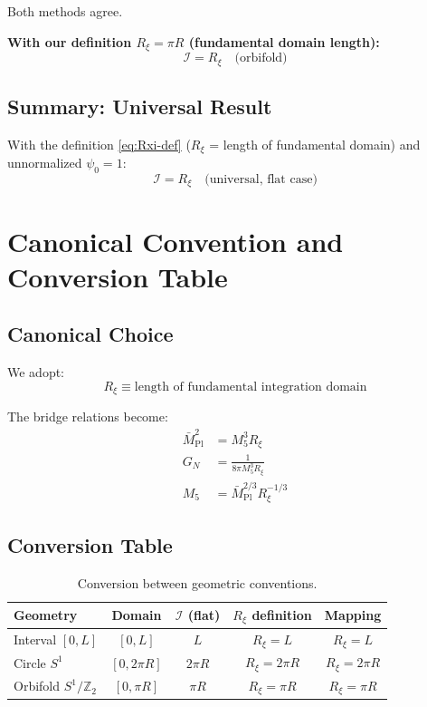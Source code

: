 \documentclass[11pt,a4paper]{article}
\newcommand{\Rxi}{R_\xi}
\newcommand{\Mplbar}{\bar{M}_{\mathrm{Pl}}}
\newcommand{\Mfive}{M_5}
\newcommand{\calI}{\mathcal{I}}
\newcommand{\GN}{G_N}
\begin{document}
Both methods agree.

\textbf{With our definition $\Rxi = \pi R$ (fundamental domain length):}
\begin{equation}
\calI = \Rxi \quad \text{(orbifold)}
\label{eq:I-Rxi-orbifold}
\end{equation}

\subsection{Summary: Universal Result}

With the definition \eqref{eq:Rxi-def} ($\Rxi$ = length of fundamental domain)
and unnormalized $\psi_0 = 1$:
\begin{equation}
\boxed{\calI = \Rxi \quad \text{(universal, flat case)}}
\label{eq:I-Rxi-universal}
\end{equation}

\section{Canonical Convention and Conversion Table}

\subsection{Canonical Choice}

We adopt:
\begin{equation}
\Rxi \equiv \text{length of fundamental integration domain}
\label{eq:canonical}
\end{equation}

The bridge relations become:
\begin{align}
\Mplbar^2 &= \Mfive^3 \Rxi \label{eq:bridge-canon} \\
\GN &= \frac{1}{8\pi \Mfive^3 \Rxi} \label{eq:GN-canon} \\
\Mfive &= \Mplbar^{2/3} \Rxi^{-1/3} \label{eq:M5-canon}
\end{align}

\subsection{Conversion Table}

\begin{table}[h]
\centering
\caption{Conversion between geometric conventions.}
\label{tab:conversion}
\begin{tabular}{@{}l c c c c@{}}
\toprule
Geometry & Domain & $\calI$ (flat) & $\Rxi$ definition & Mapping \\
\midrule
Interval $[0,L]$ & $[0,L]$ & $L$ & $\Rxi = L$ & $\Rxi = L$ \\
Circle $S^1$ & $[0,2\pi R]$ & $2\pi R$ & $\Rxi = 2\pi R$ & $\Rxi = 2\pi R$ \\
Orbifold $S^1/\mathbb{Z}_2$ & $[0,\pi R]$ & $\pi R$ & $\Rxi = \pi R$ & $\Rxi = \pi R$ \\
\bottomrule
\end{tabular}
\end{table}
\end{document}
